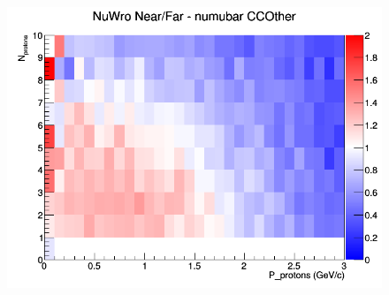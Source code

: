 \begin{figure}[h]
\endminipage
{}
\includegraphics[width=\linewidth]{N_P/nominal/protons/ratios/CCOther_NuWro_numubar_NF_N_P.png}
\endminipage
\newline
\end{figure}
\clearpage
